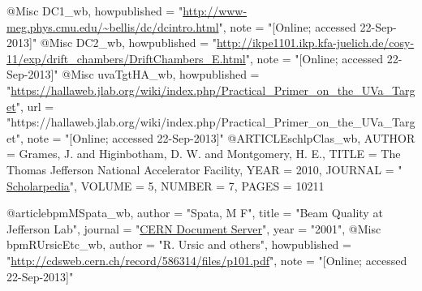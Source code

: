@Misc{ DC1_wb,
  howpublished = "\url{http://www-meg.phys.cmu.edu/\~bellis/dc/dcintro.html}", 
  note = "[Online; accessed 22-Sep-2013]"
}
@Misc{ DC2_wb,
  howpublished = "\url{http://ikpe1101.ikp.kfa-juelich.de/cosy-11/exp/drift\_chambers/DriftChambers\_E.html}", 
  note = "[Online; accessed 22-Sep-2013]"
}                 
@Misc{ uvaTgtHA_wb,
  howpublished = "\url{https://hallaweb.jlab.org/wiki/index.php/Practical\_Primer\_on\_the\_UVa\_Target}", 
  url = "https://hallaweb.jlab.org/wiki/index.php/Practical\_Primer\_on\_the\_UVa\_Target",
  note = "[Online; accessed 22-Sep-2013]"
}                  
@ARTICLE{schlpClas_wb,
AUTHOR = {Grames, J.  and Higinbotham, D. W. and Montgomery, H. E.},
TITLE   = {{The Thomas Jefferson National Accelerator Facility}},
YEAR	= 2010,
JOURNAL	= " \href{http://www.scholarpedia.org/article/The\_Thomas\_Jefferson\_National\_Accelerator\_Facility}{Scholarpedia}",
VOLUME  = 5,
NUMBER  = 7,
PAGES   = 10211
}
                    
@article{bpmMSpata_wb,
      author        = "Spata, M F",
      title         = "{Beam Quality at Jefferson Lab}",
      journal       = "\href{http://cdsweb.cern.ch/record/586314/files/p101.pdf}{CERN Document Server}",
      year          = "2001",
}
@Misc{ bpmRUrsicEtc_wb,
  author = "R. Ursic and others",
  howpublished = "\url{http://cdsweb.cern.ch/record/586314/files/p101.pdf}", 
  note = "[Online; accessed 22-Sep-2013]"
} 



